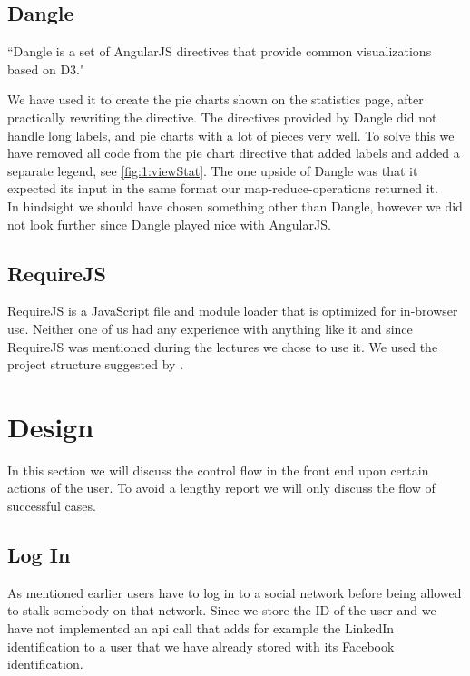 	\subsection{Dangle}
	\label{ssec:1:dangle}
		``Dangle is a set of AngularJS directives that provide common visualizations based on D3."\cite{dangle}

		We have used it to create the pie charts shown on the statistics page, after practically rewriting the directive. The directives provided by Dangle did not handle long labels, and pie charts with a lot of pieces very well. To solve this we have removed all code from the pie chart directive that added labels and added a separate legend, see \vref{fig:1:viewStat}. The one upside of Dangle was that it expected its input in the same format our map-reduce-operations returned it. \\

		In hindsight we should have chosen something other than Dangle, however we did not look further since Dangle played nice with AngularJS. 

	\subsection{RequireJS}
	\label{ssec:1:requirejs}
		RequireJS is a JavaScript file and module loader that is optimized for in-browser use. Neither one of us had any experience with anything like it and since RequireJS was mentioned during the lectures we chose to use it. We used the project structure suggested by \textcite{angularjsbook}.	

\section{Design}
\label{sec:1:design}
	In this section we will discuss the control flow in the front end upon certain actions of the user. To avoid a lengthy report we will only discuss the flow of successful cases.

	\subsection{Log In}
		As mentioned earlier users have to log in to a social network before being allowed to stalk somebody on that network. Since we store the ID of the user and we have not implemented an api call that adds for example the LinkedIn identification to a user that we have already stored with its Facebook identification.

